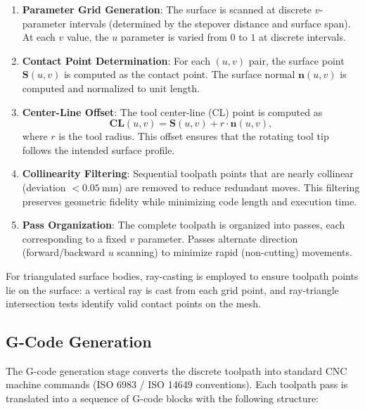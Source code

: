 \documentclass[a4paper,12pt]{article}
\begin{document}
\begin{enumerate}
  \item \textbf{Parameter Grid Generation}: The surface is scanned at discrete
    $v$-parameter intervals (determined by the stepover distance and surface
    span). At each $v$ value, the $u$ parameter is varied from $0$ to $1$ at
    discrete intervals.

  \item \textbf{Contact Point Determination}: For each $(u, v)$ pair, the
    surface point $\mathbf{S}(u, v)$ is computed as the contact point. The
    surface normal $\mathbf{n}(u, v)$ is computed and normalized to unit
    length.

  \item \textbf{Center-Line Offset}: The tool center-line (CL) point is
    computed as
    \begin{equation}
      \mathbf{CL}(u, v) = \mathbf{S}(u, v) + r \cdot \mathbf{n}(u, v),
    \end{equation}
    where $r$ is the tool radius. This offset ensures that the rotating tool
    tip follows the intended surface profile.

  \item \textbf{Collinearity Filtering}: Sequential toolpath points that are
    nearly collinear (deviation $< 0.05~\text{mm}$) are removed to reduce
    redundant moves. This filtering preserves geometric fidelity while
    minimizing code length and execution time.

  \item \textbf{Pass Organization}: The complete toolpath is organized into
    passes, each corresponding to a fixed $v$ parameter. Passes alternate
    direction (forward/backward $u$ scanning) to minimize rapid (non-cutting)
    movements.
\end{enumerate}

For triangulated surface bodies, ray-casting is employed to ensure toolpath
points lie on the surface: a vertical ray is cast from each grid point, and
ray-triangle intersection tests identify valid contact points on the mesh.

\subsection{G-Code Generation}

The G-code generation stage converts the discrete toolpath into standard CNC
machine commands (ISO 6983 / ISO 14649 conventions). Each toolpath pass is
translated into a sequence of G-code blocks with the following structure:
\end{document}
